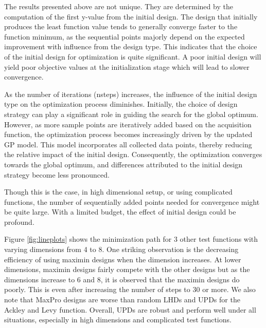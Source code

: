 \documentclass [PhD] {package/uclathes}
\begin{document}
The results presented above are not unique. They are determined by the computation of the first y-value from the initial design. The design that initially produces the least function value tends to generally converge faster to the function minimum, as the sequential points majorly depend on the expected improvement with influence from the design type. This indicates that the choice of the initial design for optimization is quite significant. A poor initial design will yield poor objective values at the initialization stage which will lead to slower convergence.

As the number of iterations (nsteps) increases, the influence of the initial design type on the optimization process diminishes. Initially, the choice of design strategy can play a significant role in guiding the search for the global optimum. However, as more sample points are iteratively added based on the acquisition function, the optimization process becomes increasingly driven by the updated GP model. This model incorporates all collected data points, thereby reducing the relative impact of the initial design. Consequently, the optimization converges towards the global optimum, and differences attributed to the initial design strategy become less pronounced.

Though this is the case, in high dimensional setup, or using complicated functions, the number of sequentially added points needed for convergence might be quite large. With a limited budget, the effect of initial design could be profound.

Figure \ref{fig:lineplots} shows the minimization path for 3 other test functions with varying dimensions from 4 to 8.
One striking observation is the decreasing efficiency of using maximin designs when the dimension increases. At lower dimensions,  maximin designs fairly compete with the other designs but as the dimensions increase to 6 and 8, it is observed that the maximin designs do poorly. This is even after increasing the number of steps to 30 or more. We also note that  MaxPro designs are worse than random LHDs and UPDs for the Ackley and Levy function. Overall, UPDs are robust and perform well under all situations, especially in high dimensions and complicated test functions.
\end{document}
